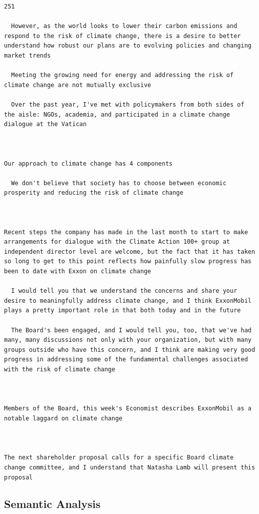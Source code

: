 \documentclass[
  letterpaper,
  DIV=11,
  numbers=noendperiod]{scrreprt}
\begin{document}
\begin{verbatim}
251

  However, as the world looks to lower their carbon emissions and respond to the risk of climate change, there is a desire to better understand how robust our plans are to evolving policies and changing market trends

  Meeting the growing need for energy and addressing the risk of climate change are not mutually exclusive

  Over the past year, I've met with policymakers from both sides of the aisle: NGOs, academia, and participated in a climate change dialogue at the Vatican

 

Our approach to climate change has 4 components

  We don't believe that society has to choose between economic prosperity and reducing the risk of climate change

 

Recent steps the company has made in the last month to start to make arrangements for dialogue with the Climate Action 100+ group at independent director level are welcome, but the fact that it has taken so long to get to this point reflects how painfully slow progress has been to date with Exxon on climate change

  I would tell you that we understand the concerns and share your desire to meaningfully address climate change, and I think ExxonMobil plays a pretty important role in that both today and in the future

  The Board's been engaged, and I would tell you, too, that we've had many, many discussions not only with your organization, but with many groups outside who have this concern, and I think are making very good progress in addressing some of the fundamental challenges associated with the risk of climate change

 

Members of the Board, this week's Economist describes ExxonMobil as a notable laggard on climate change

 

The next shareholder proposal calls for a specific Board climate change committee, and I understand that Natasha Lamb will present this proposal
\end{verbatim}

\hypertarget{semantic-analysis}{%
\subsection{Semantic Analysis}\label{semantic-analysis}}
\end{document}
